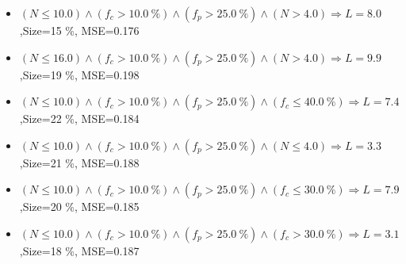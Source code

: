 \documentclass[numbered]{CSL}
\begin{document}
\begin{itemize}
\item $(N \leq 10.0) \land (f_c > 10.0~\%) \land (f_p > 25.0~\%) \land (N > 4.0) \Rightarrow L = 8.0$,\hfill Size=15 \%, MSE=0.176
\item $(N \leq 16.0) \land (f_c > 10.0~\%) \land (f_p > 25.0~\%) \land (N > 4.0) \Rightarrow L = 9.9$,\hfill Size=19 \%, MSE=0.198
\item $(N \leq 10.0) \land (f_c > 10.0~\%) \land (f_p > 25.0~\%) \land (f_c \leq 40.0~\%) \Rightarrow L = 7.4$,\hfill Size=22 \%, MSE=0.184
\item $(N \leq 10.0) \land (f_c > 10.0~\%) \land (f_p > 25.0~\%) \land (N \leq 4.0) \Rightarrow L = 3.3$,\hfill Size=21 \%, MSE=0.188
\item $(N \leq 10.0) \land (f_c > 10.0~\%) \land (f_p > 25.0~\%) \land (f_c \leq 30.0~\%) \Rightarrow L = 7.9$,\hfill Size=20 \%, MSE=0.185
\item $(N \leq 10.0) \land (f_c > 10.0~\%) \land (f_p > 25.0~\%) \land (f_c > 30.0~\%) \Rightarrow L = 3.1$,\hfill Size=18 \%, MSE=0.187
\end{itemize}
\end{document}
